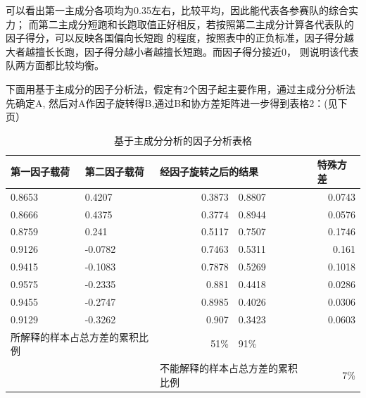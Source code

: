 \documentclass[10pt]{article}
\begin{document}
\begin{CJK}{GBK}{song}
可以看出第一主成分各项均为0.35左右，比较平均，因此能代表各参赛队的综合实力；
而第二主成分短跑和长跑取值正好相反，若按照第二主成分计算各代表队的因子得分，可以反映各国偏向长短跑
的程度，按照表中的正负标准，因子得分越大者越擅长长跑，因子得分越小者越擅长短跑。而因子得分接近0，
则说明该代表队两方面都比较均衡。

下面用基于主成分的因子分析法，假定有2个因子起主要作用，通过主成分分析法先确定A,
然后对A作因子旋转得B,通过B和协方差矩阵进一步得到表格2：(见下页）
\begin{table}[htbp]
  \centering
  \caption{基于主成分分析的因子分析表格}
    \begin{tabular}{llrlr}
    \hline
    \multicolumn{1}{l}{\bfseries 第一因子载荷} & \multicolumn{1}{l}{\bfseries 第二因子载荷} & \multicolumn{2}{l}{\bfseries 经因子旋转之后的结果} & \multicolumn{1}{l}{\bfseries 特殊方差} \\
    \hline
    0.8653 & 0.4207        & 0.3873 & 0.8807        & 0.0743 \\
    0.8666 & 0.4375        & 0.3774 & 0.8944        & 0.0576 \\
    0.8759 & 0.241       & 0.5117 & 0.7507        & 0.1746 \\
    0.9126 & -0.0782        & 0.7463 & 0.5311       & 0.161 \\
    0.9415 & -0.1083        & 0.7878 & 0.5269        & 0.1018 \\
    0.9575 & -0.2335        & 0.881 & 0.4418        & 0.0286 \\
    0.9455 & -0.2747        & 0.8985 & 0.4026        & 0.0306 \\
    0.9129 & -0.3262        & 0.907 & 0.3423        & 0.0603 \\
    \hline
   \multicolumn{2}{l}{所解释的样本占总方差的累积比例}  & 51\%  & 91\%  & \\
   \hline
   & & \multicolumn{2}{l}{不能解释的样本占总方差的累积比例}  & 7\%\\
   \hline
    \end{tabular}%
\end{table}%


\end{CJK}
\end{document}
